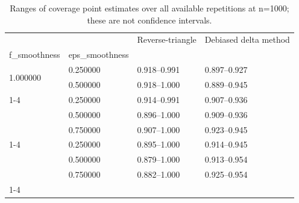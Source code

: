 \begin{table}
\caption{Ranges of coverage point estimates over all available repetitions at n=1000; these are not confidence intervals.}
\label{tab:experiment_details_additional_coverage_summary_N1000}
\begin{tabular}{llll}
\toprule
 &  & Reverse-triangle & Debiased delta method \\
f_smoothness & eps_smoothness &  &  \\
\midrule
\multirow[t]{2}{*}{1.000000} & 0.250000 & 0.918--0.991 & 0.897--0.927 \\
 & 0.500000 & 0.918--1.000 & 0.889--0.945 \\
\cline{1-4}
\multirow[t]{3}{*}{1.500000} & 0.250000 & 0.914--0.991 & 0.907--0.936 \\
 & 0.500000 & 0.896--1.000 & 0.909--0.936 \\
 & 0.750000 & 0.907--1.000 & 0.923--0.945 \\
\cline{1-4}
\multirow[t]{3}{*}{2.000000} & 0.250000 & 0.895--1.000 & 0.914--0.945 \\
 & 0.500000 & 0.879--1.000 & 0.913--0.954 \\
 & 0.750000 & 0.882--1.000 & 0.925--0.954 \\
\cline{1-4}
\bottomrule
\end{tabular}
\end{table}
